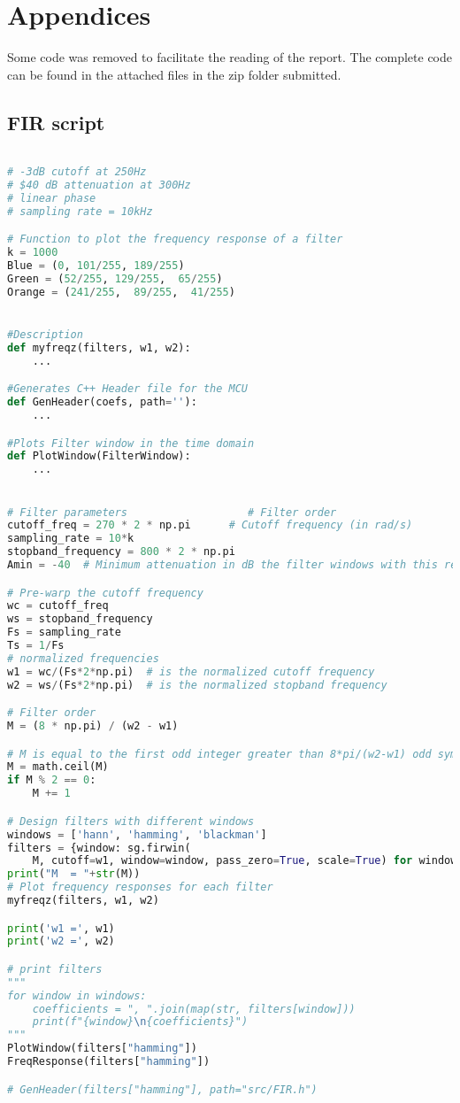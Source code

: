 \pagebreak
\section{Appendices}

Some code was removed to facilitate the reading of the report. The complete code can be found in the attached files in the zip folder submitted.

\subsection{FIR script}

\begin{lstlisting}[language=python, caption=FIR.py]

# -3dB cutoff at 250Hz
# $40 dB attenuation at 300Hz
# linear phase
# sampling rate = 10kHz

# Function to plot the frequency response of a filter
k = 1000
Blue = (0, 101/255, 189/255)
Green = (52/255, 129/255,  65/255)
Orange = (241/255,  89/255,  41/255)


#Description
def myfreqz(filters, w1, w2):
    ...

#Generates C++ Header file for the MCU
def GenHeader(coefs, path=''):
    ...

#Plots Filter window in the time domain
def PlotWindow(FilterWindow):
    ...


# Filter parameters                   # Filter order
cutoff_freq = 270 * 2 * np.pi      # Cutoff frequency (in rad/s)
sampling_rate = 10*k
stopband_frequency = 800 * 2 * np.pi
Amin = -40  # Minimum attenuation in dB the filter windows with this requirement are hamming, hann and blackman

# Pre-warp the cutoff frequency
wc = cutoff_freq
ws = stopband_frequency
Fs = sampling_rate
Ts = 1/Fs
# normalized frequencies
w1 = wc/(Fs*2*np.pi)  # is the normalized cutoff frequency
w2 = ws/(Fs*2*np.pi)  # is the normalized stopband frequency

# Filter order
M = (8 * np.pi) / (w2 - w1)

# M is equal to the first odd integer greater than 8*pi/(w2-w1) odd symmetry -> M is odd -> linear phase
M = math.ceil(M)
if M % 2 == 0:
    M += 1

# Design filters with different windows
windows = ['hann', 'hamming', 'blackman']
filters = {window: sg.firwin(
    M, cutoff=w1, window=window, pass_zero=True, scale=True) for window in windows}
print("M  = "+str(M))
# Plot frequency responses for each filter
myfreqz(filters, w1, w2)

print('w1 =', w1)
print('w2 =', w2)

# print filters
"""
for window in windows:
    coefficients = ", ".join(map(str, filters[window]))
    print(f"{window}\n{coefficients}")
"""
PlotWindow(filters["hamming"])
FreqResponse(filters["hamming"])

# GenHeader(filters["hamming"], path="src/FIR.h")

\end{lstlisting}



